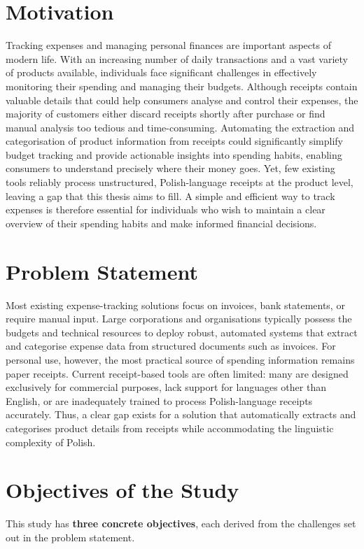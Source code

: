 \documentclass{SGGW-thesis-EN}
\begin{document}
\section{Motivation}
Tracking expenses and managing personal finances are important aspects of modern life.
With an increasing number of daily transactions and a vast variety of products available,
individuals face significant challenges in effectively monitoring their spending and managing
their budgets.
Although receipts contain valuable details that could help consumers analyse and control their
expenses, the majority of customers either discard receipts shortly after purchase or find manual
analysis too tedious and time-consuming.
Automating the extraction and categorisation of product information from receipts could
significantly simplify budget tracking and provide actionable insights into spending habits,
enabling consumers to understand precisely where their money goes.
Yet, few existing tools reliably process unstructured, Polish-language receipts at the product level,
leaving a gap that this thesis aims to fill.
A simple and efficient way to track expenses is therefore essential for individuals who wish to
maintain a clear overview of their spending habits and make informed financial decisions.

\section{Problem Statement}
Most existing expense-tracking solutions focus on invoices, bank statements, or require manual input.
Large corporations and organisations typically possess the budgets and technical resources to deploy robust,
automated systems that extract and categorise expense data from structured documents such as invoices.
For personal use, however, the most practical source of spending information remains paper receipts.
Current receipt-based tools are often limited: many are designed exclusively for commercial purposes,
lack support for languages other than English,
or are inadequately trained to process Polish-language receipts accurately.
Thus, a clear gap exists for a solution that automatically extracts and categorises product details
from receipts while accommodating the linguistic complexity of Polish.


\section{Objectives of the Study}

This study has \textbf{three concrete objectives}, each derived from the challenges set out in the problem statement.
\end{document}
